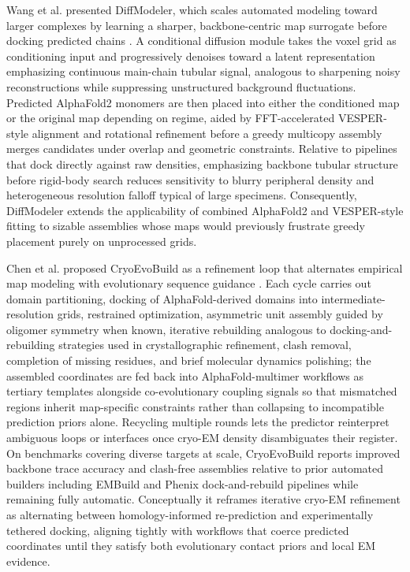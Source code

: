 \documentclass[12pt]{article}
\begin{document}
Wang et al. presented DiffModeler, which scales automated modeling toward larger complexes by learning a sharper, backbone-centric map surrogate before docking predicted chains \cite{wang2024diffmodeler}. A conditional diffusion module takes the voxel grid as conditioning input and progressively denoises toward a latent representation emphasizing continuous main-chain tubular signal, analogous to sharpening noisy reconstructions while suppressing unstructured background fluctuations. Predicted AlphaFold2 monomers are then placed into either the conditioned map or the original map depending on regime, aided by FFT-accelerated VESPER-style alignment and rotational refinement before a greedy multicopy assembly merges candidates under overlap and geometric constraints. Relative to pipelines that dock directly against raw densities, emphasizing backbone tubular structure before rigid-body search reduces sensitivity to blurry peripheral density and heterogeneous resolution falloff typical of large specimens. Consequently, DiffModeler extends the applicability of combined AlphaFold2 and VESPER-style fitting to sizable assemblies whose maps would previously frustrate greedy placement purely on unprocessed grids.

Chen et al. proposed CryoEvoBuild as a refinement loop that alternates empirical map modeling with evolutionary sequence guidance \cite{chen2026cryoevobuild}. Each cycle carries out domain partitioning, docking of AlphaFold-derived domains into intermediate-resolution grids, restrained optimization, asymmetric unit assembly guided by oligomer symmetry when known, iterative rebuilding analogous to docking-and-rebuilding strategies used in crystallographic refinement, clash removal, completion of missing residues, and brief molecular dynamics polishing; the assembled coordinates are fed back into AlphaFold-multimer workflows as tertiary templates alongside co-evolutionary coupling signals so that mismatched regions inherit map-specific constraints rather than collapsing to incompatible prediction priors alone. Recycling multiple rounds lets the predictor reinterpret ambiguous loops or interfaces once cryo-EM density disambiguates their register. On benchmarks covering diverse targets at scale, CryoEvoBuild reports improved backbone trace accuracy and clash-free assemblies relative to prior automated builders including EMBuild and Phenix dock-and-rebuild pipelines while remaining fully automatic. Conceptually it reframes iterative cryo-EM refinement as alternating between homology-informed re-prediction and experimentally tethered docking, aligning tightly with workflows that coerce predicted coordinates until they satisfy both evolutionary contact priors and local EM evidence.
\end{document}
